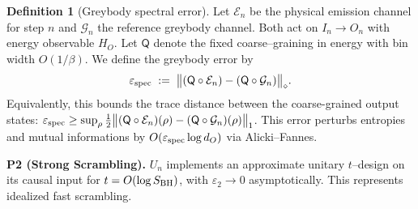 \documentclass[a4paper,11pt]{article}
\theoremstyle{plain}
\theoremstyle{definition}
\newtheorem{definition}{Definition}
\theoremstyle{remark}
\begin{document}
\begin{definition}[Greybody spectral error]
Let $\mathcal{E}_n$ be the physical emission channel for step $n$ and $\mathcal{G}_n$ the reference greybody channel. Both act on $I_n\to O_n$ with energy observable $H_O$. Let $\mathsf{Q}$ denote the fixed coarse--graining in energy with bin width $O(1/\beta)$.
We define the greybody error by
\[ \varepsilon_{\rm spec}\;:=\;\big\| (\mathsf{Q}\circ \mathcal{E}_n) - (\mathsf{Q}\circ \mathcal{G}_n)\big\|_\diamond. \]
Equivalently, this bounds the trace distance between the coarse-grained output states: $\varepsilon_{\rm spec} \ge \sup_{\rho}\tfrac12\big\|(\mathsf{Q}\circ\mathcal{E}_n)(\rho) - (\mathsf{Q}\circ\mathcal{G}_n)(\rho)\big\|_1$. This error perturbs entropies and mutual informations by $O(\varepsilon_{\rm spec}\log d_O)$ via Alicki--Fannes.
\end{definition}


\begin{center}
\end{center}


\textbf{P2 (Strong Scrambling).} $U_n$ implements an approximate unitary $t$--design on its causal input for $t=O(\log S_{\rm BH})$, with $\varepsilon_2 \to 0$ asymptotically. This represents idealized fast scrambling.
\end{document}
